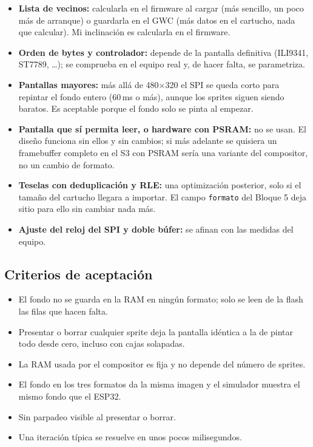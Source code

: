 \begin{itemize}
	\item \textbf{Lista de vecinos:} calcularla en el firmware al cargar (más sencillo, un poco más de arranque) o guardarla en el GWC (más datos en el cartucho, nada que calcular). Mi inclinación es calcularla en el firmware.
	\item \textbf{Orden de bytes y controlador:} depende de la pantalla definitiva (ILI9341, ST7789, \ldots); se comprueba en el equipo real y, de hacer falta, se parametriza.
	\item \textbf{Pantallas mayores:} más allá de 480$\times$320 el SPI se queda corto para repintar el fondo entero (60\,ms o más), aunque los sprites siguen siendo baratos. Es aceptable porque el fondo solo se pinta al empezar.
	\item \textbf{Pantalla que sí permita leer, o hardware con PSRAM:} no se usan. El diseño funciona sin ellos y sin cambios; si más adelante se quisiera un framebuffer completo en el S3 con PSRAM sería una variante del compositor, no un cambio de formato.
	\item \textbf{Teselas con deduplicación y RLE:} una optimización posterior, solo si el tamaño del cartucho llegara a importar. El campo \texttt{formato} del Bloque 5 deja sitio para ello sin cambiar nada más.
	\item \textbf{Ajuste del reloj del SPI y doble búfer:} se afinan con las medidas del equipo.
\end{itemize}

\subsection{Criterios de aceptación}
\label{sec:F6I01Criterios}

\begin{itemize}
	\item El fondo no se guarda en la RAM en ningún formato; solo se leen de la flash las filas que hacen falta.
	\item Presentar o borrar cualquier sprite deja la pantalla idéntica a la de pintar todo desde cero, incluso con cajas solapadas.
	\item La RAM usada por el compositor es fija y no depende del número de sprites.
	\item El fondo en los tres formatos da la misma imagen y el simulador muestra el mismo fondo que el ESP32.
	\item Sin parpadeo visible al presentar o borrar.
	\item Una iteración típica se resuelve en unos pocos milisegundos.
\end{itemize}